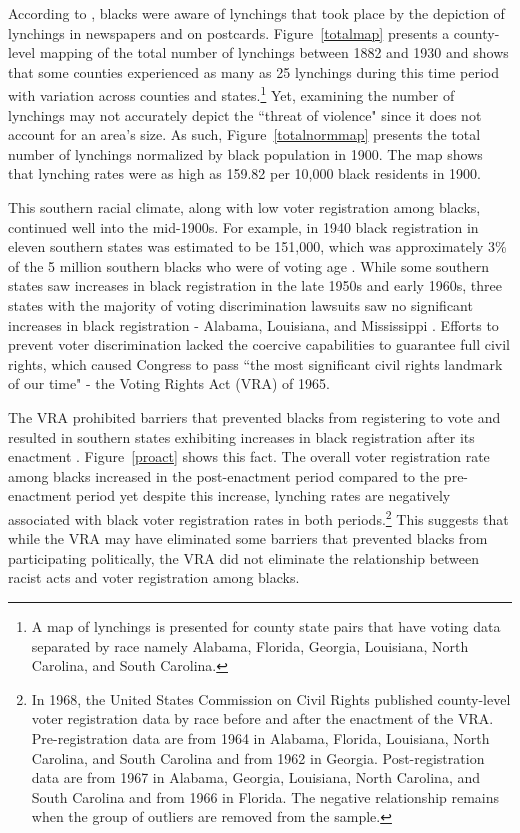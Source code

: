 \documentclass[AEJ, finalmode]{AEA}
\begin{document}
According to , blacks were aware of lynchings that took place by the depiction of lynchings in newspapers and on postcards. Figure~\ref{totalmap} presents a county-level mapping of the total number of lynchings between 1882 and 1930 and shows that some counties experienced as many as 25 lynchings during this time period with variation across counties and states.\footnote{A map of lynchings is presented for county state pairs that have voting data separated by race namely Alabama, Florida, Georgia, Louisiana, North Carolina, and South Carolina.} Yet, examining the number of lynchings may not accurately depict the ``threat of violence" since it does not account for an area's size. As such, Figure~\ref{totalnormmap} presents the total number of lynchings normalized by black population in 1900. The map shows that lynching rates were as high as 159.82 per 10,000 black residents in 1900. 

This southern racial climate, along with low voter registration among blacks, continued well into the mid-1900s. For example, in 1940 black registration in eleven southern states was estimated to be 151,000, which was approximately 3\% of the 5 million southern blacks who were of voting age \cite{garrow1978protest}. While some southern states saw increases in black registration in the late 1950s and early 1960s, three states with the majority of voting discrimination lawsuits saw no significant increases in black registration - Alabama, Louisiana, and Mississippi \cite{garrow1978protest}. Efforts to prevent voter discrimination lacked the coercive capabilities to guarantee full civil rights, which caused Congress to pass ``the most significant civil rights landmark of our time" \cite{byrne2005unfinished} - the Voting Rights Act (VRA) of 1965. 

The VRA prohibited barriers that prevented blacks from registering to vote and resulted in southern states exhibiting increases in black registration after its enactment \cite{cascio2014valuing}. Figure~\ref{proact} shows this fact. The overall voter registration rate among blacks increased in the post-enactment period compared to the pre-enactment period yet despite this increase, lynching rates are negatively associated with black voter registration rates in both periods.\footnote{In 1968, the United States Commission on Civil Rights \cite{proact} published county-level voter registration data by race before and after the enactment of the VRA. Pre-registration data are from 1964 in Alabama, Florida, Louisiana, North Carolina, and South Carolina and from 1962 in Georgia. Post-registration data are from 1967 in Alabama, Georgia, Louisiana, North Carolina, and South Carolina and from 1966 in Florida. The negative relationship remains when the group of outliers are removed from the sample.} This suggests that while the VRA may have eliminated some barriers that prevented blacks from participating politically, the VRA did not eliminate the relationship between racist acts and voter registration among blacks. 
\end{document}
